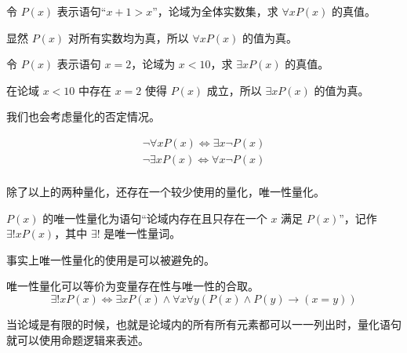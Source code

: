 \begin{collections}
    \begin{example}
        令 $P(x)$ 表示语句“$x + 1 > x$”，论域为全体实数集，求 $\forall x P(x)$ 的真值。
    \end{example}
    \begin{solution}
        显然 $P(x)$ 对所有实数均为真，所以 $\forall x P(x)$ 的值为真。
    \end{solution}

    \spare

    \begin{example}
        令 $P(x)$ 表示语句 $x = 2$，论域为 $x < 10$，求 $\exists x P(x)$ 的真值。
    \end{example}
    \begin{solution}
        在论域 $x < 10$ 中存在 $x = 2$ 使得 $P(x)$ 成立，所以 $\exists x P(x)$ 的值为真。
    \end{solution}
\end{collections}

我们也会考虑量化的否定情况。
\begin{theorem}
    \begin{equation*}
        \begin{gathered}
            \lnot \forall x P(x) \iff \exists x \lnot P(x) \\
            \lnot \exists x P(x) \iff \forall x \lnot P(x) \\
        \end{gathered}
    \end{equation*}
\end{theorem}

除了以上的两种量化，还存在一个较少使用的量化，唯一性量化。
\begin{definition}[唯一性量化]\label{def:唯一性量化}
    $P(x)$ 的唯一性量化为语句“论域内存在且只存在一个 $x$ 满足 $P(x)$”，记作 $\exists ! x P(x)$，其中 $\exists !$ 是唯一性量词。
\end{definition}

事实上唯一性量化的使用是可以被避免的。
\begin{theorem}[唯一性量化的等价形式]
    唯一性量化可以等价为变量存在性与唯一性的合取。
    \begin{equation*}
        \exists ! x P(x) \iff \exists x P(x) \land \forall x \forall y(P(x) \land P(y) \to (x = y))
    \end{equation*}
\end{theorem}

当论域是有限的时候，也就是论域内的所有所有元素都可以一一列出时，量化语句就可以使用命题逻辑来表述。

